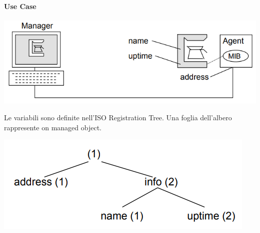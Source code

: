 \documentclass[10pt]{book}
\begin{document}
\paragraph{Use Case} 
\begin{center}
	\includegraphics[scale=0.7]{mibusecase.png}
\end{center}
Le variabili sono definite nell'ISO Registration Tree. Una foglia dell'albero rappresente on managed object.
\begin{center}
	\includegraphics[scale=0.7]{mibusecasetree.png}
\end{center}
\end{document}
